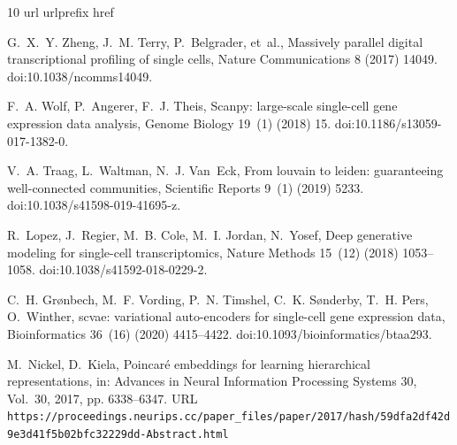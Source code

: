 \documentclass[preprint,12pt]{elsarticle}
\begin{document}
\begin{thebibliography}{10}
\expandafter\ifx\csname url\endcsname\relax
  \def\url#1{\texttt{#1}}\fi
\expandafter\ifx\csname urlprefix\endcsname\relax\def\urlprefix{URL }\fi
\expandafter\ifx\csname href\endcsname\relax
  \def\href#1#2{#2} \def\path#1{#1}\fi

G.~X.~Y. Zheng, J.~M. Terry, P.~Belgrader, et~al., Massively parallel digital
  transcriptional profiling of single cells, Nature Communications 8 (2017)
  14049.
\newblock \href {https://doi.org/10.1038/ncomms14049}
  {\path{doi:10.1038/ncomms14049}}.

F.~A. Wolf, P.~Angerer, F.~J. Theis, Scanpy: large-scale single-cell gene
  expression data analysis, Genome Biology 19~(1) (2018) 15.
\newblock \href {https://doi.org/10.1186/s13059-017-1382-0}
  {\path{doi:10.1186/s13059-017-1382-0}}.

V.~A. Traag, L.~Waltman, N.~J. Van~Eck, From louvain to leiden: guaranteeing
  well-connected communities, Scientific Reports 9~(1) (2019) 5233.
\newblock \href {https://doi.org/10.1038/s41598-019-41695-z}
  {\path{doi:10.1038/s41598-019-41695-z}}.

R.~Lopez, J.~Regier, M.~B. Cole, M.~I. Jordan, N.~Yosef, Deep generative
  modeling for single-cell transcriptomics, Nature Methods 15~(12) (2018)
  1053--1058.
\newblock \href {https://doi.org/10.1038/s41592-018-0229-2}
  {\path{doi:10.1038/s41592-018-0229-2}}.

C.~H. Gr{\o}nbech, M.~F. Vording, P.~N. Timshel, C.~K. S{\o}nderby, T.~H. Pers,
  O.~Winther, scvae: variational auto-encoders for single-cell gene expression
  data, Bioinformatics 36~(16) (2020) 4415--4422.
\newblock \href {https://doi.org/10.1093/bioinformatics/btaa293}
  {\path{doi:10.1093/bioinformatics/btaa293}}.

M.~Nickel, D.~Kiela,
  \href{https://proceedings.neurips.cc/paper_files/paper/2017/hash/59dfa2df42d9e3d41f5b02bfc32229dd-Abstract.html}{Poincar{\'e}
  embeddings for learning hierarchical representations}, in: Advances in Neural
  Information Processing Systems 30, Vol.~30, 2017, pp. 6338--6347.
\newline\urlprefix\url{https://proceedings.neurips.cc/paper_files/paper/2017/hash/59dfa2df42d9e3d41f5b02bfc32229dd-Abstract.html}


\end{thebibliography}
\end{document}

